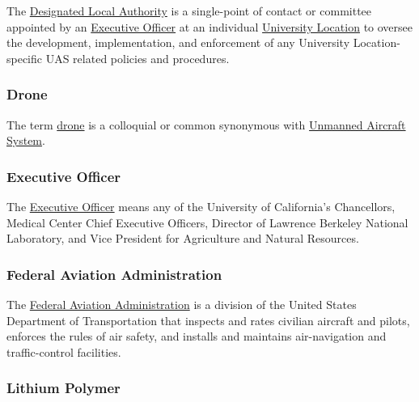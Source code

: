 \documentclass[
]{book}
\begin{document}
The \protect\hyperlink{DLA}{Designated Local Authority} is a single-point of contact or committee appointed by an \protect\hyperlink{EO}{Executive Officer} at an individual \protect\hyperlink{UL}{University Location} to oversee the development, implementation, and enforcement of any University Location-specific UAS related policies and procedures.





\hypertarget{drone}{%
\subsubsection*{Drone}\label{drone}}

The term \protect\hyperlink{drone}{drone} is a colloquial or common synonymous with \protect\hyperlink{UAS}{Unmanned Aircraft System}.



\hypertarget{EO}{%
\subsubsection*{Executive Officer}\label{EO}}

The \protect\hyperlink{EO}{Executive Officer} means any of the University of California's Chancellors, Medical Center Chief Executive Officers, Director of Lawrence Berkeley National Laboratory, and Vice President for Agriculture and Natural Resources.



\hypertarget{FAA}{%
\subsubsection*{Federal Aviation Administration}\label{FAA}}

The \protect\hyperlink{FAA}{Federal Aviation Administration} is a division of the United States Department of Transportation that inspects and rates civilian aircraft and pilots, enforces the rules of air safety, and installs and maintains air-navigation and traffic-control facilities.





\hypertarget{LiPo}{%
\subsubsection*{Lithium Polymer}\label{LiPo}}
\end{document}
